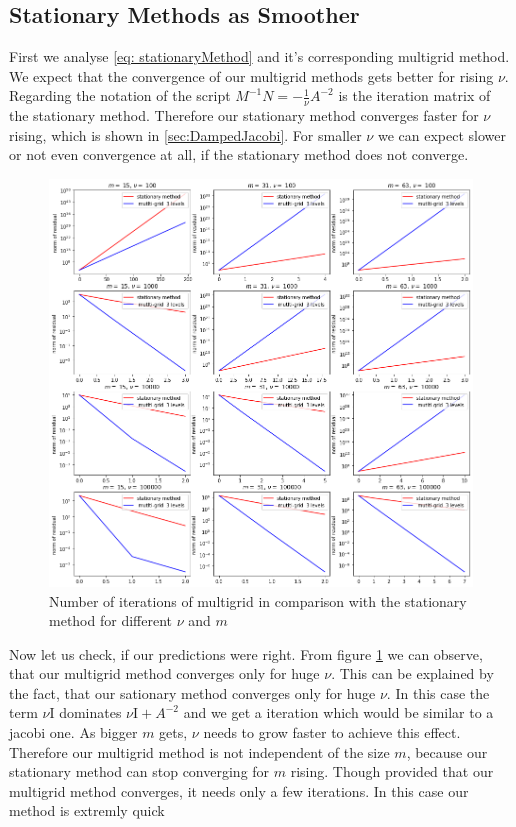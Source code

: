 \documentclass{amsart}
\theoremstyle{definition}
\theoremstyle{remark}
\numberwithin{equation}{section}
\newcommand{\Id}{\mathrm{I}}
\begin{document}

\subsection{Stationary Methods as Smoother}
First we analyse \eqref{eq: stationaryMethod} and it's corresponding multigrid method. We expect that the convergence of our multigrid methods 
gets better for rising $\nu$. Regarding the notation of the script $M^{-1} N = - \frac{1}{\nu} A^{-2} $ is the iteration matrix of the 
stationary method. Therefore our stationary method converges faster for $\nu $ rising, which is shown in \ref{sec:DampedJacobi}. For smaller $
\nu$ we can expect slower or not even convergence at all, if the stationary method does not converge. 


\begin{figure}[h!]
	\centering
	\includegraphics[scale=0.4]{./imgs/multigrid_stat_comparison_tiny}
	\caption{Number of iterations of multigrid in comparison with the stationary method for different $\nu$ and $m$}
	\label{fig: multigridStationary}
\end{figure}
Now let us check, if our predictions were right. From figure \ref{fig: multigridStationary} we can observe, that our multigrid method converges 
only for huge $\nu $. This can be explained by the fact, that our sationary method converges only for huge $\nu$. In this case the term $\nu 
\Id$ dominates $\nu \Id + A^{-2}$ and we get a iteration which would be similar to a jacobi one. As bigger $m$ gets, $\nu$ needs to grow faster 
to achieve this effect. Therefore our multigrid method is not independent of the size $m$, because our stationary method can stop converging 
for $m$ rising. Though provided that our multigrid method converges, it needs only a few iterations. In this case our method is extremly quick  
\end{document}
